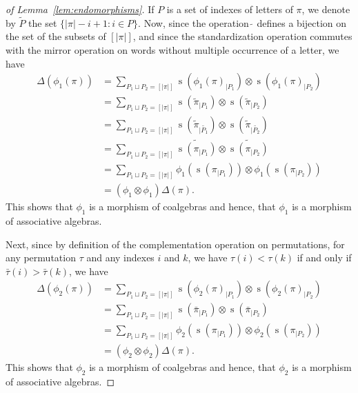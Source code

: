 \documentclass[a4paper]{llncs}
\DeclareMathOperator{\STD}{\mathrm{s}}
\begin{document}
\begin{proof}[of Lemma~\ref{lem:endomorphisms}]
    If $P$ is a set of indexes of letters of $\pi$, we denote by
    $\widetilde{P}$ the set $\{|\pi| - i  + 1 : i \in P\}$. Now, since
    the operation $\widetilde{\,}$ defines a bijection on the set of the
    subsets of $[|\pi|]$, and since the standardization operation
    commutes with the mirror operation on words without multiple
    occurrence of a letter, we have
    \begin{equation} \begin{split}
        \Delta(\phi_1(\pi))
        & = \sum_{P_1 \sqcup P_2 = [|\pi|]}
        \STD\left(\phi_1(\pi)_{|P_1}\right)
        \otimes \STD\left(\phi_1(\pi)_{|P_2}\right) \\
        & = \sum_{P_1 \sqcup P_2 = [|\pi|]}
        \STD\left(\widetilde{\pi}_{|P_1}\right)
        \otimes \STD\left(\widetilde{\pi}_{|P_2}\right) \\
        & = \sum_{P_1 \sqcup P_2 = [|\pi|]}
        \STD\left(\widetilde{\pi}_{|\widetilde{P_1}}\right)
        \otimes \STD\left(\widetilde{\pi}_{|\widetilde{P_2}}\right) \\
        & = \sum_{P_1 \sqcup P_2 = [|\pi|]}
        \widetilde{\STD\left(\pi_{|P_1}\right)}
        \otimes \widetilde{\STD\left(\pi_{|P_2}\right)} \\
        & = \sum_{P_1 \sqcup P_2 = [|\pi|]}
        \phi_1\left(\STD\left(\pi_{|P_1}\right)\right)
        \otimes \phi_1\left(\STD\left(\pi_{|P_2}\right)\right) \\
        & = (\phi_1 \otimes \phi_1) \Delta(\pi).
    \end{split} \end{equation}
    This shows that $\phi_1$ is a morphism of coalgebras and hence, that
    $\phi_1$ is a morphism of associative algebras.
    \smallskip

    Next, since by definition of the complementation operation on
    permutations, for any permutation $\tau$ and any indexes $i$ and $k$,
    we have $\tau(i) < \tau(k)$ if and only if $\bar \tau(i) > \bar \tau(k)$,
    we have
    \begin{equation} \begin{split}
        \Delta(\phi_2(\pi))
        & = \sum_{P_1 \sqcup P_2 = [|\pi|]}
        \STD\left(\phi_2(\pi)_{|P_1}\right)
        \otimes \STD\left(\phi_2(\pi)_{|P_2}\right) \\
        & = \sum_{P_1 \sqcup P_2 = [|\pi|]}
        \STD\left(\bar \pi_{|P_1}\right)
        \otimes \STD\left(\bar \pi_{|P_2}\right) \\
        & = \sum_{P_1 \sqcup P_2 = [|\pi|]}
        \phi_2\left(\STD\left(\pi_{|P_1}\right)\right)
        \otimes \phi_2\left(\STD\left(\pi_{|P_2}\right)\right) \\
        & = (\phi_2 \otimes \phi_2) \Delta(\pi).
    \end{split} \end{equation}
    This shows that $\phi_2$ is a morphism of coalgebras and hence, that
    $\phi_2$ is a morphism of associative algebras.
    \smallskip


\end{proof}
\end{document}
